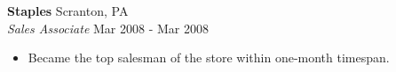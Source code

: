\textbf{Staples} \hfill Scranton, PA\\
\textit{Sales Associate} \hfill Mar 2008 - Mar 2008\\
\vspace*{-4pt}
\begin{itemize} \itemsep 1pt
	\item Became the top salesman of the store within one-month timespan.
\end{itemize}
